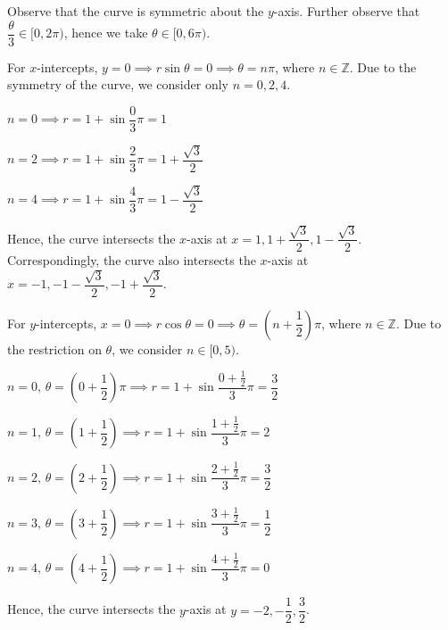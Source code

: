 \documentclass{echw}
\begin{document}
    \solution
        Observe that the curve is symmetric about the $y$-axis. Further observe that $\dfrac\theta3 \in [0, 2\pi)$, hence we take $\theta \in [0, 6\pi)$.
        
        For $x$-intercepts, $y = 0 \implies r\sin\theta = 0 \implies \theta = n\pi$, where $n \in \mathbb{Z}$. Due to the symmetry of the curve, we consider only $n = 0, 2, 4$.

         $n = 0 \implies r = 1 + \sin\dfrac03\pi = 1$
        
        \medskip

         $n = 2 \implies r = 1 + \sin\dfrac23\pi = 1 + \dfrac{\sqrt3}2$
        
        \medskip
        
         $n = 4 \implies r = 1 + \sin\dfrac43\pi = 1 - \dfrac{\sqrt3}2$

        Hence, the curve intersects the $x$-axis at $x = 1, 1 + \dfrac{\sqrt3}2, 1 - \dfrac{\sqrt3}2$. Correspondingly, the curve also intersects the $x$-axis at $x = -1, -1 - \dfrac{\sqrt3}2, -1 + \dfrac{\sqrt3}2$. 

        For $y$-intercepts, $x = 0 \implies r\cos\theta = 0 \implies \theta = \left(n + \dfrac12\right)\pi$, where $n \in \mathbb{Z}$. Due to the restriction on $\theta$, we consider $n \in [0, 5)$.

         $n = 0, \, \theta=\left(0 + \dfrac12\right)\pi \implies r = 1 + \sin\dfrac{0 + \frac12}3\pi = \dfrac32$

        \medskip

         $n = 1, \, \theta=\left(1 + \dfrac12\right)\implies r = 1 + \sin\dfrac{1 + \frac12}3\pi = 2$

        \medskip

         $n = 2, \, \theta=\left(2 + \dfrac12\right)\implies r = 1 + \sin\dfrac{2 + \frac12}3\pi = \dfrac32$

        \medskip

         $n = 3, \, \theta=\left(3 + \dfrac12\right)\implies r = 1 + \sin\dfrac{3 + \frac12}3\pi = \dfrac12$

        \medskip

         $n = 4, \, \theta=\left(4 + \dfrac12\right)\implies r = 1 + \sin\dfrac{4 + \frac12}3\pi = 0$

        Hence, the curve intersects the $y$-axis at $y = -2, -\dfrac12, \dfrac32$.
        
\end{document}
